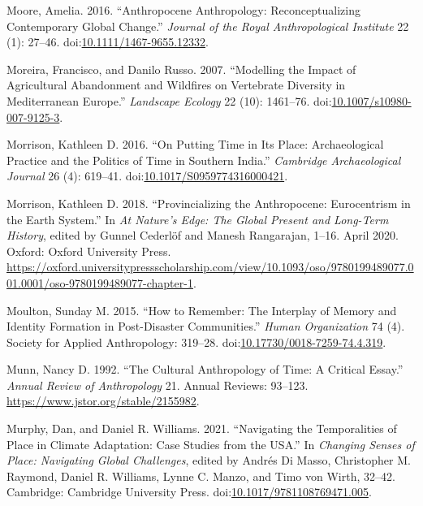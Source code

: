 \documentclass[
]{article}
\newlength{\cslhangindent}
\newenvironment{CSLReferences}[2] %
 {\begin{list}{}{%
  \setlength{\itemindent}{0pt}
  \setlength{\leftmargin}{0pt}
  \setlength{\parsep}{0pt}
  \ifodd #1
   \setlength{\leftmargin}{\cslhangindent}
   \setlength{\itemindent}{-1\cslhangindent}
  \fi
  \setlength{\itemsep}{#2\baselineskip}}}
 {\end{list}}
\begin{document}
\begin{CSLReferences}{1}{0}
Moore, Amelia. 2016. {``Anthropocene Anthropology: Reconceptualizing Contemporary Global Change.''} \emph{Journal of the Royal Anthropological Institute} 22 (1): 27--46. doi:\href{https://doi.org/10.1111/1467-9655.12332}{10.1111/1467-9655.12332}.

Moreira, Francisco, and Danilo Russo. 2007. {``Modelling the Impact of Agricultural Abandonment and Wildfires on Vertebrate Diversity in {Mediterranean Europe}.''} \emph{Landscape Ecology} 22 (10): 1461--76. doi:\href{https://doi.org/10.1007/s10980-007-9125-3}{10.1007/s10980-007-9125-3}.

Morrison, Kathleen D. 2016. {``On {Putting Time} in Its {Place}: {Archaeological Practice} and the {Politics} of {Time} in {Southern India}.''} \emph{Cambridge Archaeological Journal} 26 (4): 619--41. doi:\href{https://doi.org/10.1017/S0959774316000421}{10.1017/S0959774316000421}.

Morrison, Kathleen D. 2018. {``Provincializing the {Anthropocene}: {Eurocentrism} in the {Earth System}.''} In \emph{At {Nature}'s {Edge}: {The Global Present} and {Long-Term History}}, edited by Gunnel Cederlöf and Manesh Rangarajan, 1--16. April 2020. Oxford: Oxford University Press. \url{https://oxford.universitypressscholarship.com/view/10.1093/oso/9780199489077.001.0001/oso-9780199489077-chapter-1}.

Moulton, Sunday M. 2015. {``How to Remember: {The} Interplay of Memory and Identity Formation in Post-Disaster Communities.''} \emph{Human Organization} 74 (4). Society for Applied Anthropology: 319--28. doi:\href{https://doi.org/10.17730/0018-7259-74.4.319}{10.17730/0018-7259-74.4.319}.

Munn, Nancy D. 1992. {``The {Cultural Anthropology} of {Time}: {A Critical Essay}.''} \emph{Annual Review of Anthropology} 21. Annual Reviews: 93--123. \url{https://www.jstor.org/stable/2155982}.

Murphy, Dan, and Daniel R. Williams. 2021. {``Navigating the {Temporalities} of {Place} in {Climate Adaptation}: {Case Studies} from the {USA}.''} In \emph{Changing {Senses} of {Place}: {Navigating Global Challenges}}, edited by Andrés Di Masso, Christopher M. Raymond, Daniel R. Williams, Lynne C. Manzo, and Timo von Wirth, 32--42. Cambridge: Cambridge University Press. doi:\href{https://doi.org/10.1017/9781108769471.005}{10.1017/9781108769471.005}.


\end{CSLReferences}
\end{document}
